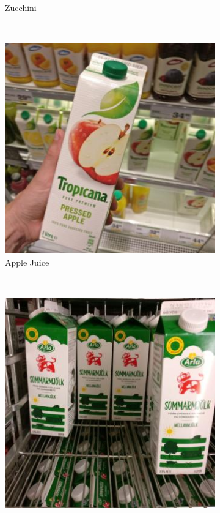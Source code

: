\begin{figure}[t]
\begin{minipage}[b]{0.47\textwidth}
\begin{subfigure}[t]{0.32\textwidth}
			\caption{Zucchini}
			\label{subfig:real-image-l}
		\end{subfigure}~ \\[1mm]
		\begin{subfigure}[t]{0.32\textwidth}
			\centering
			\includegraphics[width=\textwidth]{PaperA/dataset-figure/Tropicana-Apple-Juice_16.jpg}
			\caption{Apple Juice}
			\label{subfig:real-image-n}
		\end{subfigure}~
		\begin{subfigure}[t]{0.32\textwidth}
			\centering
			\includegraphics[width=\textwidth]{PaperA/dataset-figure/Arla-Milk-Medium-Fat_17.jpg}

\end{subfigure}
\end{minipage}
\end{figure}
